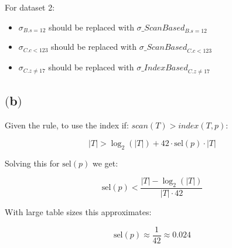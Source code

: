 For dataset 2:
\begin{itemize}
	\item ${\sigma}_{B.s=12}$ should be replaced with ${\sigma \_ScanBased}_{B.s=12}$
	\item ${\sigma}_{C.c<123}$ should be replaced with ${\sigma \_ScanBased}_{C.c<123}$
	\item ${\sigma}_{C.z \neq 17}$ should be replaced with ${\sigma \_IndexBased}_{C.z \neq 17}$
\end{itemize}


\subsection{$($b$)$}

Given the rule, to use the index if: $scan(T) > index(T,p)$:

\[
|T| > \log_2(|T|) + 42 \cdot \text{sel}(p) \cdot |T|
\]

Solving this for $\text{sel}(p)$ we get:

\[
\text{sel}(p) < \frac{|T| - \log_2(|T|)}{|T| \cdot 42}
\]

With large table sizes this approximates:

\[
\text{sel}(p) \approx \frac{1}{42} \approx 0.024
\]

